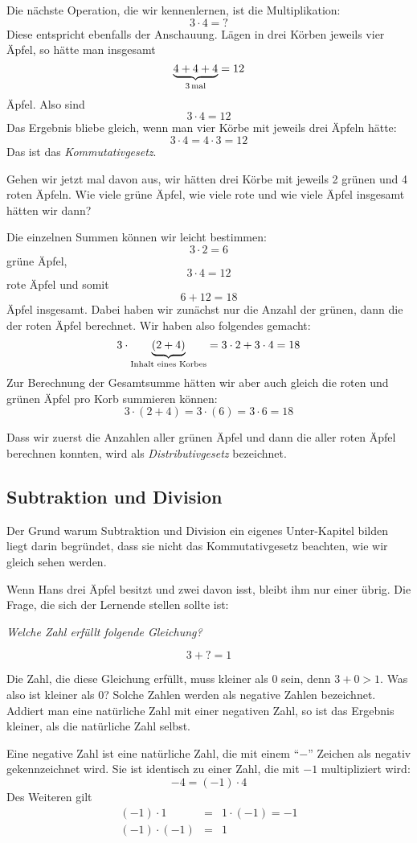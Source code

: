 Die nächste Operation, die wir kennenlernen, ist die Multiplikation:
\[3\cdot 4 = ?\]
Diese entspricht ebenfalls der Anschauung. Lägen in drei Körben jeweils vier Äpfel, so hätte man insgesamt
\[\underbrace{4+4+4}_{3 \, \textnormal{mal}} = 12\]
Äpfel. Also sind 
\[3\cdot 4 = 12\]
Das Ergebnis bliebe gleich, wenn man vier Körbe mit jeweils drei Äpfeln hätte:
\[3\cdot 4 = 4\cdot 3 = 12\]
Das ist das \emph{Kommutativgesetz}.

Gehen wir jetzt mal davon aus, wir hätten drei Körbe mit jeweils 2 grünen und 4 roten Äpfeln. Wie viele grüne Äpfel, wie viele rote und wie viele Äpfel insgesamt hätten wir dann?

Die einzelnen Summen können wir leicht bestimmen: 
\[3\cdot 2 = 6\]
grüne Äpfel,
\[3\cdot 4 = 12 \]
rote Äpfel und somit
\[6+12 = 18\]
Äpfel insgesamt. Dabei haben wir zunächst nur die Anzahl der grünen, dann die der roten Äpfel berechnet. Wir haben also folgendes gemacht:
\[3\cdot \underbrace{(2+4)}_{\textnormal{Inhalt eines Korbes}} = 3\cdot 2 + 3\cdot 4 = 18\]
Zur Berechnung der Gesamtsumme hätten wir aber auch gleich die roten und grünen Äpfel pro Korb summieren können:
\[3\cdot (2+4) = 3\cdot (6) = 3\cdot 6 = 18 \]

Dass wir zuerst die Anzahlen aller grünen Äpfel und dann die aller roten Äpfel berechnen konnten, wird als  \emph{Distributivgesetz} bezeichnet.

\subsection{Subtraktion und Division}

Der Grund warum Subtraktion und Division ein eigenes Unter-Kapitel bilden liegt darin begründet, dass sie nicht das Kommutativgesetz beachten, wie wir gleich sehen werden.

Wenn Hans drei Äpfel besitzt und zwei davon isst, bleibt ihm nur einer übrig. Die Frage, die sich der Lernende stellen sollte ist:

\textsl{Welche Zahl erfüllt folgende Gleichung?}

\[3 + ? = 1\]

Die Zahl, die diese Gleichung erfüllt, muss kleiner als 0 sein, denn $3+0 > 1$. Was also ist kleiner als 0? Solche Zahlen werden als negative Zahlen bezeichnet. Addiert man eine natürliche Zahl mit einer negativen Zahl, so ist das Ergebnis kleiner, als die natürliche Zahl selbst. 

\begin{definition}
Eine negative Zahl ist eine natürliche Zahl, die mit einem "`$-$"' Zeichen als negativ gekennzeichnet wird. Sie ist identisch zu einer Zahl, die mit $-1$ multipliziert wird:
\[ -4 = (-1) \cdot 4 \]
Des Weiteren gilt
\begin{eqnarray*}
(-1)\cdot 1 &=& 1\cdot (-1) = -1 \\
(-1)\cdot (-1) &=& 1
\end{eqnarray*}

\end{definition}

